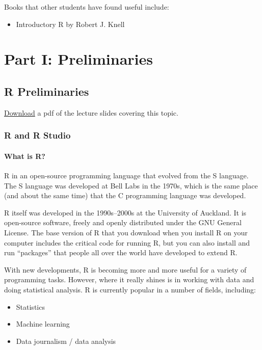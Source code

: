 \documentclass[]{book}
\providecommand{\tightlist}{%
  \setlength{\itemsep}{0pt}\setlength{\parskip}{0pt}}
\begin{document}
Books that other students have found useful include:

\begin{itemize}
\tightlist
\item
  Introductory R by Robert J. Knell
\end{itemize}

\part{Part I: Preliminaries}\label{part-part-i-preliminaries}


\chapter{R Preliminaries}\label{r-preliminaries}

\href{https://github.com/geanders/RProgrammingForResearch/raw/master/slides/CourseNotes_Week1.pdf}{Download}
a pdf of the lecture slides covering this topic.

\section{R and R Studio}\label{r-and-r-studio}

\subsection{What is R?}\label{what-is-r}

R in an open-source programming language that evolved from the S
language. The S language was developed at Bell Labs in the 1970s, which
is the same place (and about the same time) that the C programming
language was developed.

R itself was developed in the 1990s--2000s at the University of
Auckland. It is open-source software, freely and openly distributed
under the GNU General License. The base version of R that you download
when you install R on your computer includes the critical code for
running R, but you can also install and run ``packages'' that people all
over the world have developed to extend R.

With new developments, R is becoming more and more useful for a variety
of programming tasks. However, where it really shines is in working with
data and doing statistical analysis. R is currently popular in a number
of fields, including:

\begin{itemize}
\tightlist
\item
  Statistics
\item
  Machine learning
\item
  Data journalism / data analysis
\end{itemize}
\end{document}
